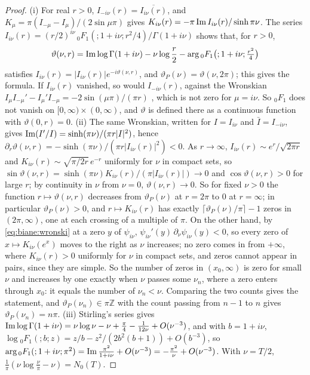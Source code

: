 \begin{proof}
(i) For real $r>0$, $I_{-i\nu}(r)=\overline{I_{i\nu}(r)}$, and $K_\mu=\pi(I_{-\mu}-I_\mu)/(2\sin\mu\pi)$ gives $K_{i\nu}(r)=-\pi\operatorname{Im} I_{i\nu}(r)/\sinh\pi\nu$. The series $I_{i\nu}(r)=(r/2)^{i\nu}\,{}_0F_1(;1+i\nu;r^2/4)/\Gamma(1+i\nu)$ shows that, for $r>0$,
\[
\vartheta(\nu,r)=\operatorname{Im}\log\Gamma(1+i\nu)-\nu\log\frac r2-\arg{}_0F_1\big(;1+i\nu;\tfrac{r^2}4\big)
\]
satisfies $I_{i\nu}(r)=|I_{i\nu}(r)|e^{-i\vartheta(\nu,r)}$, and $\vartheta_P(\nu)=\vartheta(\nu,2\pi)$; this gives the formula. If $I_{i\nu}(r)$ vanished, so would $I_{-i\nu}(r)$, against the Wronskian $I_\mu I_{-\mu}'-I_\mu'I_{-\mu}=-2\sin(\mu\pi)/(\pi r)$ \cite[(10.28.1)]{DLMF}, which is not zero for $\mu=i\nu$. So ${}_0F_1$ does not vanish on $[0,\infty)\times(0,\infty)$, and $\vartheta$ is defined there as a continuous function with $\vartheta(0,r)=0$. (ii) The same Wronskian, written for $I=I_{i\nu}$ and $\bar I=I_{-i\nu}$, gives $\operatorname{Im}(I'/I)=\sinh(\pi\nu)/(\pi r|I|^2)$, hence $\partial_r\vartheta(\nu,r)=-\sinh(\pi\nu)/(\pi r|I_{i\nu}(r)|^2)<0$. As $r\to\infty$, $I_{i\nu}(r)\sim e^r/\sqrt{2\pi r}$ and $K_{i\nu}(r)\sim\sqrt{\pi/2r}\,e^{-r}$ uniformly for $\nu$ in compact sets, so $\sin\vartheta(\nu,r)=\sinh(\pi\nu)K_{i\nu}(r)/(\pi|I_{i\nu}(r)|)\to0$ and $\cos\vartheta(\nu,r)>0$ for large $r$; by continuity in $\nu$ from $\nu=0$, $\vartheta(\nu,r)\to0$. So for fixed $\nu>0$ the function $r\mapsto\vartheta(\nu,r)$ decreases from $\vartheta_P(\nu)$ at $r=2\pi$ to $0$ at $r=\infty$; in particular $\vartheta_P(\nu)>0$, and $r\mapsto K_{i\nu}(r)$ has exactly $\lceil\vartheta_P(\nu)/\pi\rceil-1$ zeros in $(2\pi,\infty)$, one at each crossing of a multiple of $\pi$. On the other hand, by \eqref{eq:biane:wronski} at a zero $y$ of $\psi_{i\nu}$, $\psi_{i\nu}'(y)\,\partial_\nu\psi_{i\nu}(y)<0$, so every zero of $x\mapsto K_{i\nu}(e^x)$ moves to the right as $\nu$ increases; no zero comes in from $+\infty$, where $K_{i\nu}(r)>0$ uniformly for $\nu$ in compact sets, and zeros cannot appear in pairs, since they are simple. So the number of zeros in $(x_0,\infty)$ is zero for small $\nu$ and increases by one exactly when $\nu$ passes some $\nu_n$, where a zero enters through $x_0$: it equals the number of $\nu_n<\nu$. Comparing the two counts gives the statement, and $\vartheta_P(\nu_n)\in\pi\mathbb Z$ with the count passing from $n-1$ to $n$ gives $\vartheta_P(\nu_n)=n\pi$. (iii) Stirling's series gives $\operatorname{Im}\log\Gamma(1+i\nu)=\nu\log\nu-\nu+\frac\pi4-\frac1{12\nu}+O(\nu^{-3})$, and with $b=1+i\nu$, $\log{}_0F_1(;b;z)=z/b-z^2/(2b^2(b+1))+O(b^{-3})$, so $\arg{}_0F_1(;1+i\nu;\pi^2)=\operatorname{Im}\frac{\pi^2}{1+i\nu}+O(\nu^{-3})=-\frac{\pi^2}\nu+O(\nu^{-3})$. With $\nu=T/2$, $\frac1\pi(\nu\log\frac\nu\pi-\nu)=N_0(T)$.
\end{proof}

